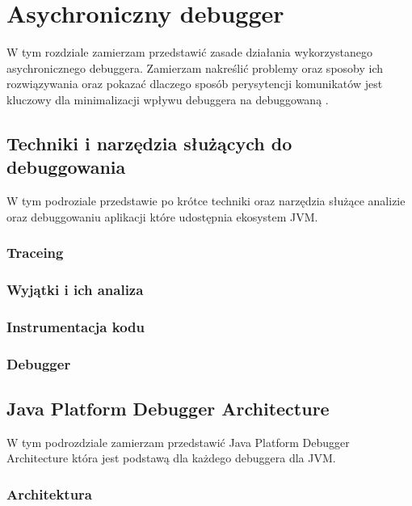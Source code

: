 \chapter{Asychroniczny debugger}

W tym rozdziale zamierzam przedstawić zasade działania wykorzystanego asychronicznego debuggera. Zamierzam nakreślić problemy oraz sposoby ich rozwiązywania oraz pokazać dlaczego sposób perysytencji komunikatów jest kluczowy dla minimalizacji wpływu debuggera na debuggowaną .


\section{Techniki i narzędzia służących do debuggowania}

W tym podroziale przedstawie po krótce techniki oraz narzędzia służące analizie oraz debuggowaniu aplikacji które udostępnia ekosystem JVM. 

\subsection{Traceing}

\subsection{Wyjątki i ich analiza}

\subsection{Instrumentacja kodu}

\subsection{Debugger}

\section{Java Platform Debugger Architecture}

W tym podrozdziale zamierzam przedstawić Java Platform Debugger Architecture która jest podstawą dla każdego debuggera dla JVM.

\subsection{Architektura}

